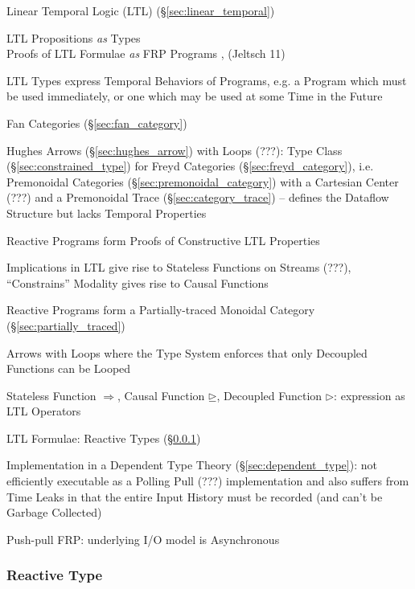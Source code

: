 Linear Temporal Logic (LTL) (\S\ref{sec:linear_temporal})

LTL Propositions \emph{as} Types \\
Proofs of LTL Formulae \emph{as} FRP Programs \cite{jeffrey12},
(Jeltsch 11)

LTL Types express Temporal Behaviors of Programs, e.g. a Program which
must be used immediately, or one which may be used at some Time in the
Future \cite{jeffrey12} %

Fan Categories (\S\ref{sec:fan_category}) \cite{jeltsch12}

Hughes Arrows (\S\ref{sec:hughes_arrow}) with Loops (???): Type Class
(\S\ref{sec:constrained_type}) for Freyd Categories
(\S\ref{sec:freyd_category}), i.e. Premonoidal Categories
(\S\ref{sec:premonoidal_category}) with a Cartesian Center (???) and a
Premonoidal Trace (\S\ref{sec:category_trace}) -- defines the Dataflow
Structure but lacks Temporal Properties \cite{jeffrey12}

Reactive Programs form Proofs of Constructive LTL Properties
\cite{jeffrey12}

Implications in LTL give rise to Stateless Functions on Streams (???),
``Constrains'' Modality gives rise to Causal Functions
\cite{jeffrey12} %

Reactive Programs form a Partially-traced Monoidal Category
(\S\ref{sec:partially_traced}) \cite{jeffrey12}

Arrows with Loops where the Type System enforces that only Decoupled
Functions can be Looped \cite{jeffrey12}

Stateless Function $\Rightarrow$, Causal Function $\unrhd$, Decoupled
Function $\rhd$: expression as LTL Operators \cite{jeffrey12}

LTL Formulae: Reactive Types (\S\ref{sec:reactive_type})

Implementation in a Dependent Type Theory
(\S\ref{sec:dependent_type}): not efficiently executable as a Polling
Pull (???) implementation and also suffers from Time Leaks in that the
entire Input History must be recorded (and can't be Garbage Collected)
\cite{jeffrey12}

Push-pull FRP: underlying I/O model is Asynchronous



\subsubsection{Reactive Type}\label{sec:reactive_type}

